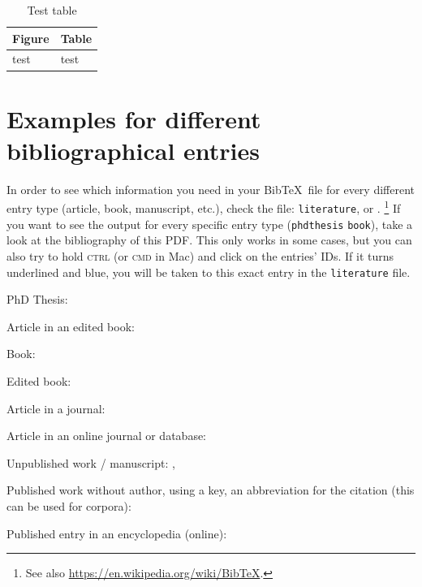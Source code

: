 \bigskip

\begin{table}[ht!]
	\centering
\begin{tabular}{l|l}
	Figure & Table \\
	\hline
	test & test \\
\end{tabular}
	\caption[Text table]{Test table}
\end{table}


\section{Examples for different bibliographical entries}
\label{ch:BibEntries}


In order to see which information you need in your Bib\TeX\ file for every different entry type (article, book, manuscript, etc.), check the file: \texttt{literature}, or \citet{Freitag&MyP15a}.%
	\footnote{See also \url{https://en.wikipedia.org/wiki/BibTeX}.} %
If you want to see the output for every specific entry type (\fe \texttt{phdthesis} \vs \texttt{book}), take a look at the bibliography of this PDF. This only works in some cases, but you can also try to hold \textsc{ctrl} (or \textsc{cmd} in Mac) and click on the entries' IDs. If it turns underlined and blue, you will be taken to this exact entry in the \texttt{literature} file.


\begin{itemize*}
	\item PhD Thesis: \citet{Abney87a}
	
	\item Article in an edited book: \citet{Ackema15a}
	
	\item Book: \citet{Adger04a}
	
	\item Edited book: \citet{Kertesz&Co19a} %
	
	\item Article in a journal: \citet{Barwise&Co81a}
	
	\item Article in an online journal or database:
	\citet{Kolb&Co10a}
	
	\item Unpublished work / manuscript: \citet{LeipzigGloss15a}, \citet{MyP17c}
	
	\item Published work without author, using a key, \ie an abbreviation for the citation (this can be used \fe for corpora): \citep{DR17a}
	
	\item Published entry in an encyclopedia (online): \citet{MyP18b}
\end{itemize*}


